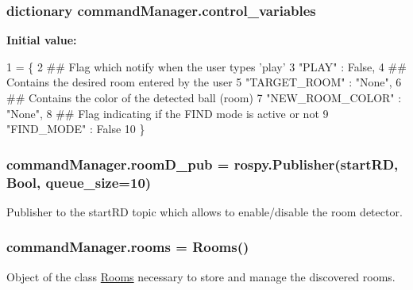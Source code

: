 \subsubsection[{\texorpdfstring{control\+\_\+variables}{control_variables}}]{\setlength{\rightskip}{0pt plus 5cm}dictionary command\+Manager.\+control\+\_\+variables}\hypertarget{namespacecommandManager_a3c82d03952562f9cf96be2e80ae059a3}{}\label{namespacecommandManager_a3c82d03952562f9cf96be2e80ae059a3}
{\bfseries Initial value\+:}
\begin{DoxyCode}
1 = \{
2     \textcolor{comment}{## Flag which notify when the user types 'play'}
3     \textcolor{stringliteral}{"PLAY"} : \textcolor{keyword}{False},
4     \textcolor{comment}{## Contains the desired room entered by the user }
5     \textcolor{stringliteral}{"TARGET\_ROOM"} : \textcolor{stringliteral}{"None"},
6     \textcolor{comment}{## Contains the color of the detected ball (room) }
7     \textcolor{stringliteral}{"NEW\_ROOM\_COLOR"} : \textcolor{stringliteral}{"None"},
8     \textcolor{comment}{## Flag indicating if the FIND mode is active or not }
9     \textcolor{stringliteral}{"FIND\_MODE"} : \textcolor{keyword}{False}   
10 \}
\end{DoxyCode}
\subsubsection[{\texorpdfstring{room\+D\+\_\+pub}{roomD_pub}}]{\setlength{\rightskip}{0pt plus 5cm}command\+Manager.\+room\+D\+\_\+pub = rospy.\+Publisher(\textquotesingle{}start\+RD\textquotesingle{}, Bool, queue\+\_\+size=10)}\hypertarget{namespacecommandManager_a5cf709943d61e92e0ce4c1652403ae8d}{}\label{namespacecommandManager_a5cf709943d61e92e0ce4c1652403ae8d}


Publisher to the start\+RD topic which allows to enable/disable the room detector. 

\subsubsection[{\texorpdfstring{rooms}{rooms}}]{\setlength{\rightskip}{0pt plus 5cm}command\+Manager.\+rooms = {\bf Rooms}()}\hypertarget{namespacecommandManager_a868809e1f6a79e7b7ce5ea405e978d48}{}\label{namespacecommandManager_a868809e1f6a79e7b7ce5ea405e978d48}


Object of the class \hyperlink{namespaceRooms}{Rooms} necessary to store and manage the discovered rooms. 

